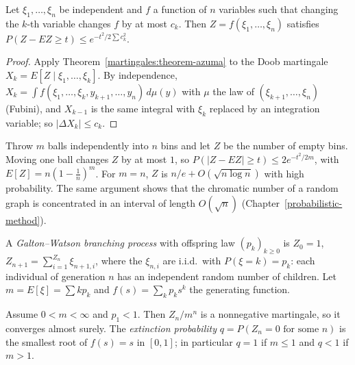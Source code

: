 \begin{corollary}\label{martingales:corollary-bounded-differences}
Let $\xi_1, \ldots, \xi_n$ be independent and $f$ a function of $n$ variables such that changing the $k$-th variable changes $f$ by at most $c_k$. Then $Z = f(\xi_1, \ldots, \xi_n)$ satisfies
$P(Z - EZ \geq t) \leq e^{-t^2/2\sum c_k^2}$.
\end{corollary}

\begin{proof}
Apply Theorem~\ref{martingales:theorem-azuma} to the Doob martingale $X_k = E[Z \mid \xi_1, \ldots, \xi_k]$. By independence, $X_k = \int f(\xi_1, \ldots, \xi_k, y_{k+1}, \ldots, y_n)\,d\mu(y)$ with $\mu$ the law of $(\xi_{k+1}, \ldots, \xi_n)$ (Fubini), and
$X_{k-1}$ is the same integral with $\xi_k$ replaced by an integration variable; so $|\Delta X_k| \leq c_k$.
\end{proof}

\begin{example}\label{martingales:example-bounded-differences}
Throw $m$ balls independently into $n$ bins and let $Z$ be the number of empty bins. Moving one ball changes $Z$ by at most $1$, so $P(|Z - EZ| \geq t) \leq 2e^{-t^2/2m}$, with $E[Z] = n(1 - \frac1n)^m$. For $m = n$, $Z$ is
$n/e + O(\sqrt{n\log n})$ with high probability. The same argument shows that the chromatic number of a random graph is concentrated in an interval of length $O(\sqrt n)$ (Chapter~\ref{probabilistic-method}).
\end{example}

\begin{definition}\label{martingales:definition-branching}
A \emph{Galton--Watson branching process} with offspring law $(p_k)_{k \geq 0}$ is $Z_0 = 1$, $Z_{n+1} = \sum_{i=1}^{Z_n}\xi_{n+1,i}$, where the $\xi_{n,i}$ are i.i.d.\ with $P(\xi = k) = p_k$: each individual of generation $n$
has an independent random number of children. Let $m = E[\xi] = \sum kp_k$ and $f(s) = \sum_kp_ks^k$ the generating function.
\end{definition}

\begin{theorem}\label{martingales:theorem-branching}
Assume $0 < m < \infty$ and $p_1 < 1$. Then $Z_n/m^n$ is a nonnegative martingale, so it converges almost surely. The \emph{extinction probability} $q = P(Z_n = 0 \text{ for some } n)$ is the smallest root of $f(s) = s$ in
$[0, 1]$; in particular $q = 1$ if $m \leq 1$ and $q < 1$ if $m > 1$.
\end{theorem}

